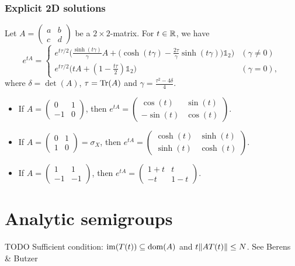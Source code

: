 \subsubsection{Explicit 2D solutions}
\begin{proposition}
Let $A = \begin{pmatrix}
a & b \\ c & d
\end{pmatrix}$ be a $2\times 2$-matrix. For $t\in \mathbb{R}$, we have
\[ e^{tA} = \begin{cases}
e^{t\tau/2}\Big(\frac{\sinh(t\gamma)}{\gamma}A + \big(\cosh(t\gamma) - \frac{2\tau}{\gamma}\sinh(t\gamma)\big)\mathbb{1}_2\Big) & (\gamma \neq 0) \\
e^{t\tau/2}\big(tA + (1-\frac{t\tau}{2})\mathbb{1}_2\big) & (\gamma = 0),
\end{cases} \]
where $\delta = \det(A)$, $\tau = \operatorname{Tr}(A)$ and $\gamma = \frac{\tau^2 - 4\delta}{4}$.
\end{proposition}

\begin{example}
\begin{itemize}
\item If $A = \begin{pmatrix}
0 & 1 \\ -1 & 0
\end{pmatrix}$, then $e^{tA} = \begin{pmatrix}
\cos(t) & \sin(t) \\ -\sin(t) & \cos(t)
\end{pmatrix}$.
\item If $A = \begin{pmatrix}
0 & 1 \\ 1 & 0
\end{pmatrix} = \sigma_X$, then $e^{tA} = \begin{pmatrix}
\cosh(t) & \sinh(t) \\ \sinh(t) & \cosh(t)
\end{pmatrix}$.
\item If $A = \begin{pmatrix}
1 & 1 \\ -1 & -1
\end{pmatrix}$, then $e^{tA} = \begin{pmatrix}
1+t & t \\ -t & 1-t
\end{pmatrix}$.
\end{itemize}
\end{example}


\section{Analytic semigroups}
TODO Sufficient condition: $\operatorname{im}(T(t)) \subseteq \operatorname{dom}(A)$ and $t\lVert AT(t)\rVert \leq N$. See Berens \& Butzer

